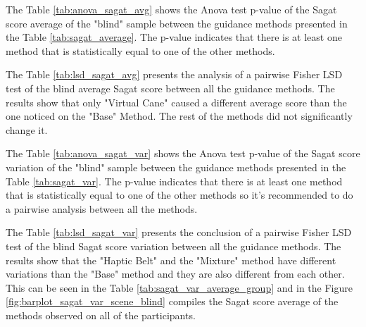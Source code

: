 %

\begin{table}[!htb]
    \begin{minipage}{.45\linewidth}
        
    \end{minipage}
    \hfill
    \begin{minipage}{.45\linewidth}
        \vspace{-2.75cm}
        
    \end{minipage}
\end{table}

The Table \ref{tab:anova_sagat_avg} shows the Anova test p-value of the Sagat score average of the "blind" sample between the guidance methods presented in the Table \ref{tab:sagat_average}. The p-value indicates that there is at least one method that is statistically equal to one of the other methods.



The Table \ref{tab:lsd_sagat_avg} presents the analysis of a pairwise Fisher LSD test of the blind average Sagat score between all the guidance methods. The results show that only "Virtual Cane" caused a different average score than the one noticed on the "Base" Method. The rest of the methods did not significantly change it.



The Table \ref{tab:anova_sagat_var} shows the Anova test p-value of the Sagat score variation of the "blind" sample between the guidance methods presented in the Table \ref{tab:sagat_var}. The p-value indicates that there is at least one method that is statistically equal to one of the other methods so it's recommended to do a pairwise analysis between all the methods.





The Table \ref{tab:lsd_sagat_var} presents the conclusion of a pairwise Fisher LSD test of the blind Sagat score variation between all the guidance methods. The results show that the "Haptic Belt" and the "Mixture" method have different variations than the "Base" method and they are also different from each other. This can be seen in the Table \ref{tab:sagat_var_average_group} and in the Figure \ref{fig:barplot_sagat_var_scene_blind} compiles the Sagat score average of the methods observed on all of the participants.

